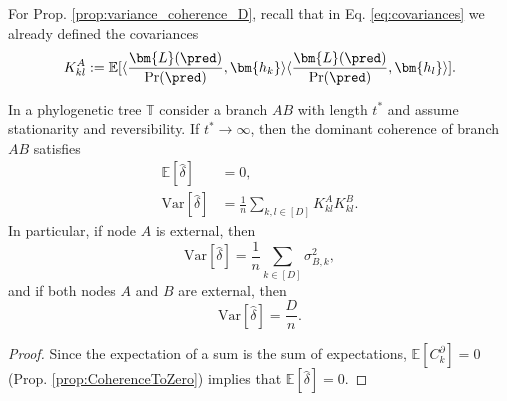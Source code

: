 \begin{appendices}
\medskip

For Prop. \ref{prop:variance_coherence_D}, recall that in Eq. \ref{eq:covariances} we already defined the covariances
\begin{equation*}
K^A_{kl} :=  \mathbb{E}[\langle \frac{\bm{L}(\pred)}{\Pr(\pred)}, \bm{h_k} \rangle \langle \frac{\bm{L}(\pred)}{\Pr(\pred)}, \bm{h_l} \rangle].
\end{equation*}
 
\begin{prop} \label{prop:variance_coherence_D}  In a phylogenetic tree $\mathbb{T}$ consider a branch $AB$ with length $t^*$ and assume stationarity and reversibility.  If $t^* \to \infty$, then the dominant coherence of branch $AB$ satisfies
\begin{align}
 \mathbb{E}[\hat{\delta}] &= 0,\\
 \mathrm{Var}[\hat{\delta}] &= \frac{1}{n}\sum_{k, l \in [D]} 
   K^A_{kl}   K^B_{kl}.
\end{align}
In particular, if node $A$ is external, then 
\begin{equation} \label{eq:externalMultiple}
 \mathrm{Var}[\hat{\delta}] = \frac{1}{n}\sum_{k \in [D]} 
      \sigma^2_{B, k},
\end{equation}
and if both nodes $A$ and $B$ are external, then 
\begin{equation}
 \mathrm{Var}[\hat{\delta}] = \frac{D}{n}.
 \end{equation}
\end{prop}
\begin{proof} Since the expectation of a sum is the sum of expectations, $\mathbb{E}[C_k^\partial] = 0$ (Prop. \ref{prop:CoherenceToZero}) implies that  $\mathbb{E}[\hat{\delta}] = 0$. 
 
 \medskip
 

\end{proof}
\end{appendices}
